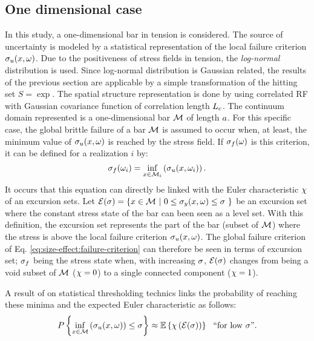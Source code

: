 \documentclass[12pt]{article}
\begin{document}
\subsection{One dimensional case}
In this study, a one-dimensional bar in tension is considered. The source of uncertainty is modeled by a statistical representation of the local failure criterion $\sigma_u(x,\omega)$. Due to the positiveness of stress fields in tension, the \emph{log-normal} distribution is used. Since log-normal distribution is Gaussian related, the results of the previous section are applicable by a simple transformation of the hitting set $S=\exp$. The spatial structure representation is done by using correlated RF with Gaussian covariance function of correlation length $L_c$. The continuum domain represented is a one-dimensional bar $\mathcal{M}$ of length $a$. For this specific case, the global brittle failure of a bar $\mathcal{M}$ is assumed to occur when, at least, the minimum value of $\sigma_u(x,\omega)$ is reached by the stress field. If $\sigma_f(\omega)$ is this criterion, it can be defined for a realization $i$ by: 
\begin{equation}
  \sigma_f(\omega_i) = \underset{x \in \mathcal{M}_i}{\inf}\left(\sigma_u(x,\omega_i)\right).
  \label{eq:size-effect:failure-criterion}
\end{equation}
It occurs that this equation can directly be linked with the Euler characteristic $\chi$ of an excursion sets. Let $\mathcal{E}(\sigma) = \left\{x \in \mathcal{M} \ | \ 0 \le \sigma_{y}(x,\omega)\leq\sigma \ \right\}$ be an excursion set where the constant stress state of the bar can been seen as a level set. With this definition, the excursion set represents the part of the bar (subset of $\mathcal{M}$) where the stress is above the local failure criterion $\sigma_u(x,\omega)$. The global failure criterion of Eq. \ref{eq:size-effect:failure-criterion} can therefore be seen in terms of excursion set; $\sigma_f$ being the stress state when, with increasing $\sigma$, $\mathcal{E}(\sigma)$ changes from being a void subset of $\mathcal{M}$ ($\chi = 0$) to a single connected component ($\chi = 1$).
\par A result of \cite{adler_new_2008} on statistical thresholding technics links the probability of reaching these minima and the expected Euler characteristic as follows:
\begin{equation}
  \label{eq:size-effect:prob-failure-criterion}
  P\left\{ \underset{x\in \mathcal{M}}{\inf}\left( \sigma_u(x,\omega) \right) \leq \sigma \right\} \approx \mathbb{E}\left\{ \chi\left(\mathcal{E}(\sigma)\right) \right\} \ \ \text{``for low $\sigma$''}.
\end{equation}
\end{document}
